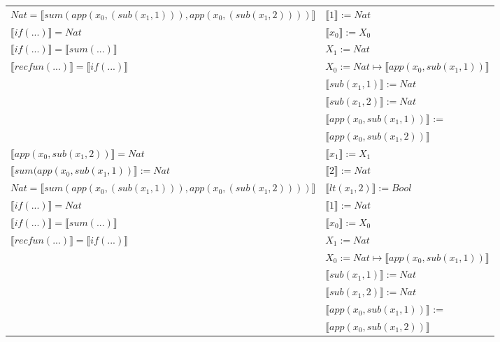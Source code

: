 \begin{exercise}
\begin{description}
\begin{center}
\begin{longtable}[!h]{ | l | l | }
                        $Nat =  \llbracket sum(app(x_0, (sub(x_1,1))), app(x_0, (sub(x_1,2)))) \rrbracket$ &    $ \llbracket 1 \rrbracket := Nat$\\
                        $ \llbracket if(...) \rrbracket = Nat$ &  $ \llbracket x_0 \rrbracket := X_0$\\ 
                        $ \llbracket if(...) \rrbracket =  \llbracket sum(...) \rrbracket$ &  $X_1 := Nat$\\ 
                        $ \llbracket recfun(...) \rrbracket =  \llbracket if(...) \rrbracket$ &  $X_0 := Nat \mapsto  \llbracket app(x_0, sub(x_1,1)) \rrbracket$\\ 
                        &  $ \llbracket sub(x_1,1) \rrbracket := Nat$\\ 
                        &  $ \llbracket sub(x_1,2) \rrbracket := Nat$ \\
			     &  $ \llbracket app(x_0, sub(x_1,1)) \rrbracket$ := \\
			     &  $ \llbracket app(x_0, sub(x_1,2)) \rrbracket$\\
                    \hline
                        $ \llbracket app(x_0, sub(x_1,2)) \rrbracket = Nat$ &  $ \llbracket x_1 \rrbracket := X_1$\\   
                        $ \llbracket sum(app(x_0, sub(x_1,1)) \rrbracket := Nat$ &  $ \llbracket 2 \rrbracket := Nat$\\
                        $Nat =  \llbracket sum(app(x_0, (sub(x_1,1))), app(x_0, (sub(x_1,2)))) \rrbracket$ & $ \llbracket lt(x_1 , 2) \rrbracket := Bool$\\
                        $ \llbracket if(...) \rrbracket = Nat$ &   $ \llbracket 1 \rrbracket := Nat$\\ 
                        $ \llbracket if(...) \rrbracket =  \llbracket sum(...) \rrbracket$ & $ \llbracket x_0 \rrbracket := X_0$\\
                        $ \llbracket recfun(...) \rrbracket =  \llbracket if(...) \rrbracket$ &  $X_1 := Nat$\\
                        & $X_0 := Nat \mapsto  \llbracket app(x_0, sub(x_1,1)) \rrbracket$\\ 
                        & $ \llbracket sub(x_1,1) \rrbracket := Nat$\\
			     & $ \llbracket sub(x_1,2) \rrbracket := Nat$ \\
			     & $ \llbracket app(x_0, sub(x_1,1)) \rrbracket$ := \\
			     & $ \llbracket app(x_0, sub(x_1,2)) \rrbracket$\\ 

\end{longtable}
\end{center}
\end{description}
\end{exercise}
